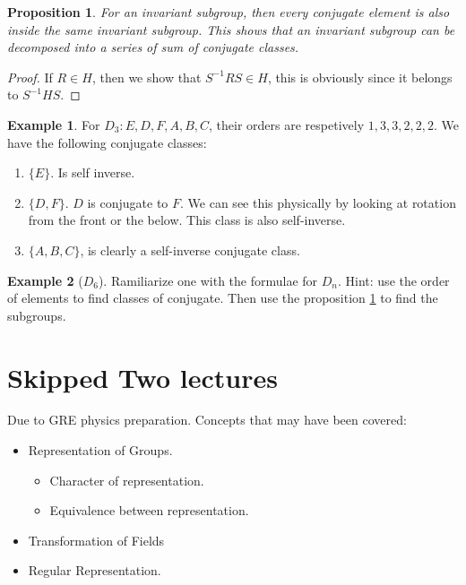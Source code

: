 \documentclass{article}
\numberwithin{equation}{subsection} %
\newtheorem{prop}{Proposition}[section]
\theoremstyle{definition}
\newtheorem{ex}{Example}[section]
\begin{document}
\begin{prop}
    \label{prop:20161010.conjugate_subgroup}
    For an invariant subgroup, then every conjugate element is also
    inside the same invariant subgroup. This shows that an invariant
    subgroup can be decomposed into a series of sum of conjugate classes.
\end{prop}
\begin{proof}
    If $R\in H$, then we show that $S^{-1}RS\in H$, this is obviously
    since it belongs to $S^{-1}HS$.
\end{proof}

\begin{ex}
    For $D_3: E,D,F,A,B,C$, their orders are respetively
    $1,3,3,2,2,2$. We have the following conjugate classes:
    \begin{enumerate}
        \item $\{ E\}$. Is self inverse.
        \item $\{ D,F\}$. $D$ is conjugate to $F$. We can see
            this physically by looking at rotation from the front
            or the below. This class is also self-inverse.
        \item $\{A,B,C\}$, is clearly a self-inverse conjugate
            class.
    \end{enumerate}
\end{ex}
\begin{ex}[$D_6$]
    Ramiliarize one with the formulae for $D_n$. Hint: use the order of
    elements to find classes of conjugate. Then use the proposition
    \ref{prop:20161010.conjugate_subgroup} to find the subgroups.
\end{ex}





\section{Skipped Two lectures}
Due to GRE physics preparation. Concepts that may have been covered:

\begin{itemize}
    \item Representation of Groups.
        \begin{itemize}
            \item Character of representation.
            \item Equivalence between representation.
        \end{itemize}
    \item Transformation of Fields
    \item Regular Representation.
\end{itemize}
\end{document}

